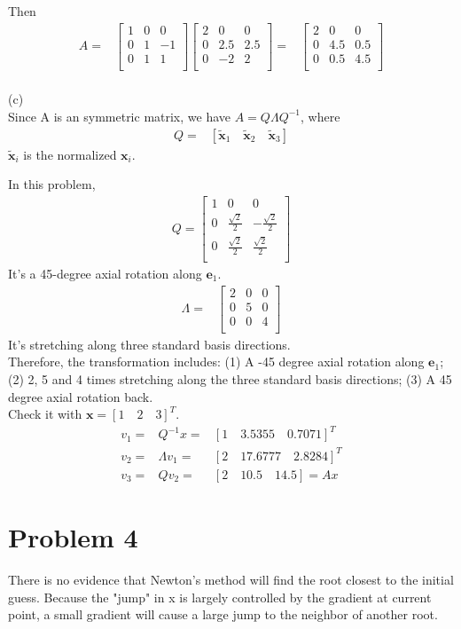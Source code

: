 \documentclass[12pt]{article}
\begin{document}
Then
\begin{eqnarray*}
A=
&\begin{bmatrix}
1&  0&  0\\
0&  1&  -1\\
0&  1&   1\\
\end{bmatrix}
\begin{bmatrix}
2&  0&  0\\
0&  2.5&  2.5\\
0&  -2&   2\\
\end{bmatrix}
=
&\begin{bmatrix}
2&  0&  0\\
0&  4.5&  0.5\\
0&  0.5&   4.5\\
\end{bmatrix}
\end{eqnarray*}\\
(c)\\
Since A is an symmetric matrix, we have $A=Q\Lambda Q^{-1}$, where 
\begin{eqnarray*}
Q=&\left[ \boldsymbol{\tilde{x}}_{1}\quad  \boldsymbol{\tilde{x}}_{2}\quad \boldsymbol{\tilde{x}}_{3}\right] 
\end{eqnarray*}
$\boldsymbol{\tilde{x}}_{i}$ is the normalized $\boldsymbol{x}_{i}$.

In this problem, 
\begin{eqnarray*}
Q=\begin{bmatrix}
1&  0&  0\\
0&  \frac{\sqrt{2}}{2}&  -\frac{\sqrt{2}}{2}\\
0&  \frac{\sqrt{2}}{2}&   \frac{\sqrt{2}}{2}\\
\end{bmatrix}
\end{eqnarray*}
It's a 45-degree axial rotation along $\boldsymbol{e}_{1}$.
\begin{eqnarray*}
\Lambda=
&\begin{bmatrix}
2 &  0&  0\\
0&  5&  0\\
0&  0&   4\\
\end{bmatrix}
\end{eqnarray*}
It's stretching along three standard basis directions.\\
Therefore, the transformation includes: (1) A -45 degree axial rotation along $\boldsymbol{e}_{1}$; (2) 2, 5 and 4 times stretching along the three standard basis directions; (3) A 45 degree axial rotation back.\\
Check it with $ \boldsymbol{x} = [ 1\quad 2\quad 3 ]^{T} $.
\begin{eqnarray*}
v_{1} =& Q^{-1}x =& [1\quad 3.5355 \quad 0.7071]^{T} \\
v_{2} =& \Lambda v_{1} =& [2\quad 17.6777 \quad 2.8284]^{T}\\
v_{3} =& Qv_{2} =& [2\quad 10.5\quad 14.5] = Ax
\end{eqnarray*}

\newpage
\section{Problem 4}
There is no evidence that Newton's method will find the root closest to the initial guess. Because the "jump" in x is largely controlled by the gradient at current point, a small gradient will cause a large jump to the neighbor of another root.
\end{document}
